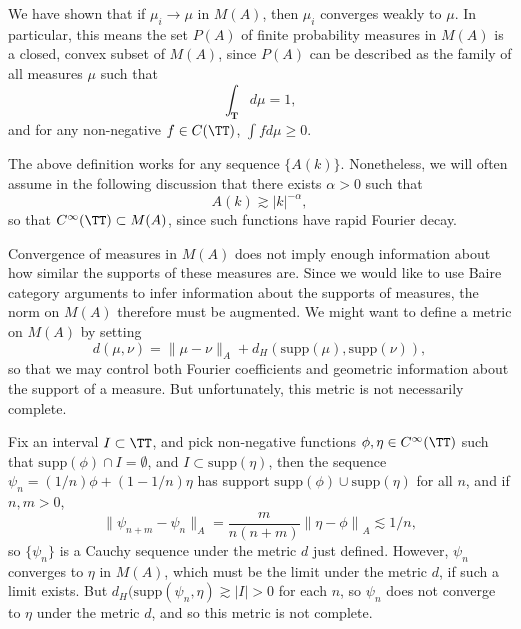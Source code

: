 \begin{remark}
	We have shown that if $\mu_i \to \mu$ in $M(A)$, then $\mu_i$ converges weakly to $\mu$. In particular, this means the set $P(A)$ of finite probability measures in $M(A)$ is a closed, convex subset of $M(A)$, since $P(A)$ can be described as the family of all measures $\mu$ such that
	\[ \int_{\mathbf{T}} d\mu = 1, \]
	and for any non-negative $f \in C(\TT)$, $\int f d\mu \geq 0$.
\end{remark}

\begin{remark}
	The above definition works for any sequence $\{ A(k) \}$. Nonetheless, we will often assume in the following discussion that there exists $\alpha > 0$ such that
	\[ A(k) \gtrsim |k|^{-\alpha}, \]
	so that $C^\infty(\TT) \subset M(A)$, since such functions have rapid Fourier decay.
\end{remark}

Convergence of measures in $M(A)$ does not imply enough information about how similar the supports of these measures are. Since we would like to use Baire category arguments to infer information about the supports of measures, the norm on $M(A)$ therefore must be augmented. We might want to define a metric on $M(A)$ by setting
%
\[ d(\mu,\nu) = \| \mu - \nu \|_A + d_H(\text{supp}(\mu), \text{supp}(\nu)), \]
%
so that we may control both Fourier coefficients and geometric information about the support of a measure. But unfortunately, this metric is not necessarily complete.

\begin{example}
	Fix an interval $I \subset \TT$, and pick non-negative functions $\phi, \eta \in C^\infty(\TT)$ such that $\text{supp}(\phi) \cap I = \emptyset$, and $I \subset \text{supp}(\eta)$, then the sequence $\psi_n = (1/n) \phi + (1 - 1/n) \eta$ has support $\text{supp}(\phi) \cup \text{supp}(\eta)$ for all $n$, and if $n,m > 0$,
	\[ \| \psi_{n + m} - \psi_n \|_A = \frac{m}{n(n+m)} \left\| \eta - \phi \right\|_A \lesssim 1/n, \]
	so $\{ \psi_n \}$ is a Cauchy sequence under the metric $d$ just defined. However, $\psi_n$ converges to $\eta$ in $M(A)$, which must be the limit under the metric $d$, if such a limit exists. But $d_H(\text{supp}(\psi_n, \eta) \gtrsim |I| > 0$ for each $n$, so $\psi_n$ does not converge to $\eta$ under the metric $d$, and so this metric is not complete.
\end{example}

